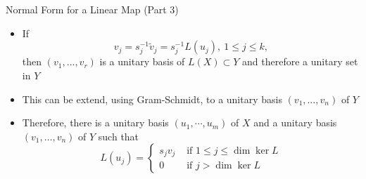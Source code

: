 \documentclass[usenames,dvipsnames,10pt]{beamer}
\begin{document}
\begin{frame}
  {Normal Form for a Linear Map (Part 3)}

  \begin{itemize}
  \item If
    \[
      v_j = s_j^{-1}\tilde{v}_j = s_j^{-1}L(u_j),\ 1 \le j \le k,
    \]
    then $(v_1, \dots, v_r)$ is a unitary basis of $L(X) \subset Y$ and therefore a unitary set in $Y$
  \item This can be extend, using Gram-Schmidt, to a unitary basis $(v_1, \dots, v_n)$ of $Y$
  \item Therefore, there is a unitary basis $(u_1, \cdots, u_m)$ of $X$ and a unitary basis $(v_1, \dots, v_n)$ of $Y$ such that
    \[
      L(u_j) =
      \begin{cases}
        s_jv_j &\text{ if }1 \le j \le \dim \ker L\\
        0 &\text{ if }j > \dim \ker L
      \end{cases}
    \]
  \end{itemize}
\end{frame}
\end{document}
